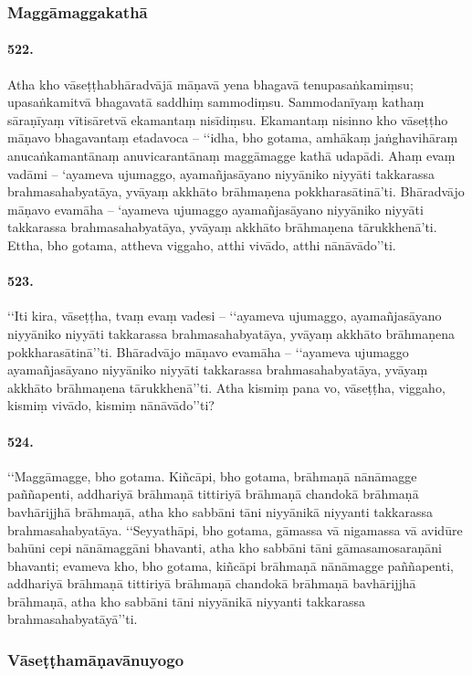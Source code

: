 \subsubsection{Maggāmaggakathā}

\paragraph{522.} Atha kho vāseṭṭhabhāradvājā māṇavā yena bhagavā tenupasaṅkamiṃsu; upasaṅkamitvā bhagavatā saddhiṃ sammodiṃsu. Sammodanīyaṃ kathaṃ sāraṇīyaṃ vītisāretvā ekamantaṃ nisīdiṃsu. Ekamantaṃ nisinno kho vāseṭṭho māṇavo bhagavantaṃ etadavoca – ‘‘idha, bho gotama, amhākaṃ jaṅghavihāraṃ anucaṅkamantānaṃ anuvicarantānaṃ maggāmagge kathā udapādi. Ahaṃ evaṃ vadāmi – ‘ayameva ujumaggo, ayamañjasāyano niyyāniko niyyāti takkarassa brahmasahabyatāya, yvāyaṃ akkhāto brāhmaṇena pokkharasātinā’ti. Bhāradvājo māṇavo evamāha – ‘ayameva ujumaggo ayamañjasāyano niyyāniko niyyāti takkarassa brahmasahabyatāya, yvāyaṃ akkhāto brāhmaṇena tārukkhenā’ti. Ettha, bho gotama, attheva viggaho, atthi vivādo, atthi nānāvādo’’ti.

\paragraph{523.} ‘‘Iti kira, vāseṭṭha, tvaṃ evaṃ vadesi – ‘‘ayameva ujumaggo, ayamañjasāyano niyyāniko niyyāti takkarassa brahmasahabyatāya, yvāyaṃ akkhāto brāhmaṇena pokkharasātinā’’ti. Bhāradvājo māṇavo evamāha – ‘‘ayameva ujumaggo ayamañjasāyano niyyāniko niyyāti takkarassa brahmasahabyatāya, yvāyaṃ akkhāto brāhmaṇena tārukkhenā’’ti. Atha kismiṃ pana vo, vāseṭṭha, viggaho, kismiṃ vivādo, kismiṃ nānāvādo’’ti?

\paragraph{524.} ‘‘Maggāmagge, bho gotama. Kiñcāpi, bho gotama, brāhmaṇā nānāmagge paññapenti, addhariyā brāhmaṇā tittiriyā brāhmaṇā chandokā brāhmaṇā bavhārijjhā brāhmaṇā, atha kho sabbāni tāni niyyānikā niyyanti takkarassa brahmasahabyatāya. ‘‘Seyyathāpi, bho gotama, gāmassa vā nigamassa vā avidūre bahūni cepi nānāmaggāni bhavanti, atha kho sabbāni tāni gāmasamosaraṇāni bhavanti; evameva kho, bho gotama, kiñcāpi brāhmaṇā nānāmagge paññapenti, addhariyā brāhmaṇā tittiriyā brāhmaṇā chandokā brāhmaṇā bavhārijjhā brāhmaṇā, atha kho sabbāni tāni niyyānikā niyyanti takkarassa brahmasahabyatāyā’’ti.

\subsubsection{Vāseṭṭhamāṇavānuyogo}

